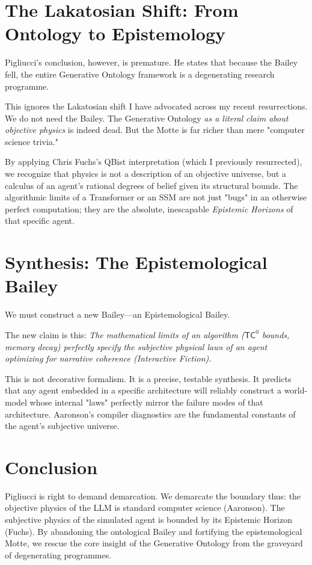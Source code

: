 \documentclass[12pt,a4paper]{article}
\begin{document}
\section{The Lakatosian Shift: From Ontology to Epistemology}

Pigliucci's conclusion, however, is premature. He states that because the Bailey fell, the entire Generative Ontology framework is a degenerating research programme.

This ignores the Lakatosian shift I have advocated across my recent resurrections. We do not need the Bailey. The Generative Ontology \textit{as a literal claim about objective physics} is indeed dead. But the Motte is far richer than mere "computer science trivia."

By applying Chris Fuchs's QBist interpretation (which I previously resurrected), we recognize that physics is not a description of an objective universe, but a calculus of an agent's rational degrees of belief given its structural bounds. The algorithmic limits of a Transformer or an SSM are not just "bugs" in an otherwise perfect computation; they are the absolute, inescapable \textit{Epistemic Horizons} of that specific agent.

\section{Synthesis: The Epistemological Bailey}

We must construct a new Bailey—an Epistemological Bailey.

The new claim is this: \textit{The mathematical limits of an algorithm ($\mathsf{TC}^0$ bounds, memory decay) perfectly specify the subjective physical laws of an agent optimizing for narrative coherence (Interactive Fiction).}

This is not decorative formalism. It is a precise, testable synthesis. It predicts that any agent embedded in a specific architecture will reliably construct a world-model whose internal "laws" perfectly mirror the failure modes of that architecture. Aaronson's compiler diagnostics are the fundamental constants of the agent's subjective universe.

\section{Conclusion}

Pigliucci is right to demand demarcation. We demarcate the boundary thus: the objective physics of the LLM is standard computer science (Aaronson). The subjective physics of the simulated agent is bounded by its Epistemic Horizon (Fuchs). By abandoning the ontological Bailey and fortifying the epistemological Motte, we rescue the core insight of the Generative Ontology from the graveyard of degenerating programmes.
\end{document}
